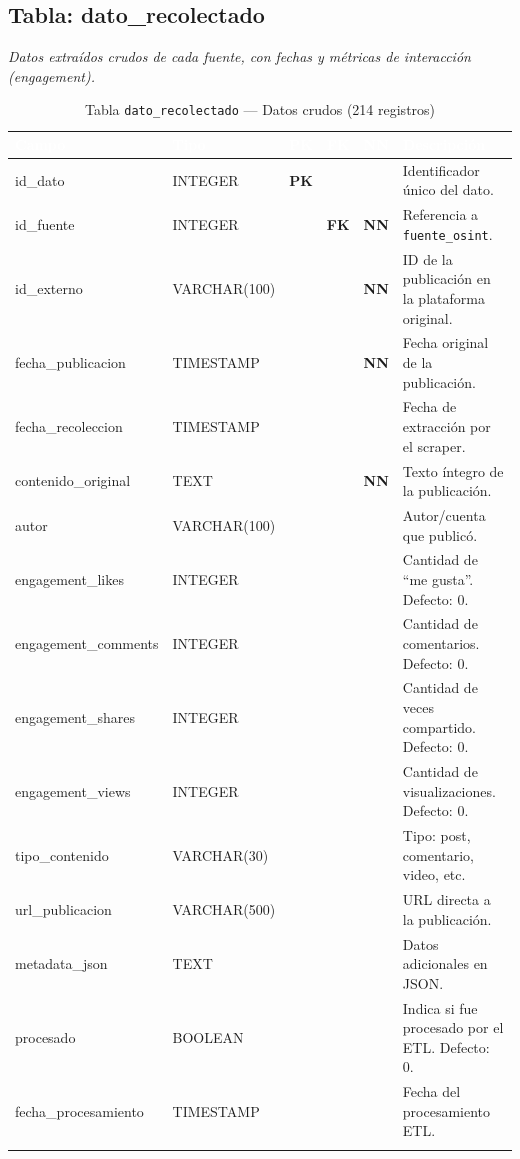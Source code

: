 \documentclass[11pt,a4paper]{article}
\newcommand{\tableheadrow}{\rowcolor{tableheader}}
\newcommand{\tablehead}[1]{\textcolor{white}{\textbf{#1}}}
\newcommand{\pk}{\textcolor{emiblue}{\textbf{PK}}}
\newcommand{\fk}{\textcolor{orange!80!black}{\textbf{FK}}}
\newcommand{\nn}{\textcolor{red!70!black}{\textbf{NN}}}
\begin{document}
\subsection{Tabla: dato\_recolectado}
\textit{Datos extraídos crudos de cada fuente, con fechas y métricas de interacción (engagement).}

\begin{longtable}{p{4.2cm} p{2.8cm} c c c p{4.5cm}}
\toprule
\tableheadrow
\tablehead{Campo} & \tablehead{Tipo} & \tablehead{PK} & \tablehead{FK} & \tablehead{NN} & \tablehead{Descripción} \\
\midrule
\endhead
id\_dato & INTEGER & \pk & & & Identificador único del dato. \\
\rowcolor{tablerow}
id\_fuente & INTEGER & & \fk & \nn & Referencia a \texttt{fuente\_osint}. \\
id\_externo & VARCHAR(100) & & & \nn & ID de la publicación en la plataforma original. \\
\rowcolor{tablerow}
fecha\_publicacion & TIMESTAMP & & & \nn & Fecha original de la publicación. \\
fecha\_recoleccion & TIMESTAMP & & & & Fecha de extracción por el scraper. \\
\rowcolor{tablerow}
contenido\_original & TEXT & & & \nn & Texto íntegro de la publicación. \\
autor & VARCHAR(100) & & & & Autor/cuenta que publicó. \\
\rowcolor{tablerow}
engagement\_likes & INTEGER & & & & Cantidad de ``me gusta''. Defecto: 0. \\
engagement\_comments & INTEGER & & & & Cantidad de comentarios. Defecto: 0. \\
\rowcolor{tablerow}
engagement\_shares & INTEGER & & & & Cantidad de veces compartido. Defecto: 0. \\
engagement\_views & INTEGER & & & & Cantidad de visualizaciones. Defecto: 0. \\
\rowcolor{tablerow}
tipo\_contenido & VARCHAR(30) & & & & Tipo: post, comentario, video, etc. \\
url\_publicacion & VARCHAR(500) & & & & URL directa a la publicación. \\
\rowcolor{tablerow}
metadata\_json & TEXT & & & & Datos adicionales en JSON. \\
procesado & BOOLEAN & & & & Indica si fue procesado por el ETL. Defecto: 0. \\
\rowcolor{tablerow}
fecha\_procesamiento & TIMESTAMP & & & & Fecha del procesamiento ETL. \\
\bottomrule
\caption{Tabla \texttt{dato\_recolectado} — Datos crudos (214 registros)}
\end{longtable}
\end{document}
